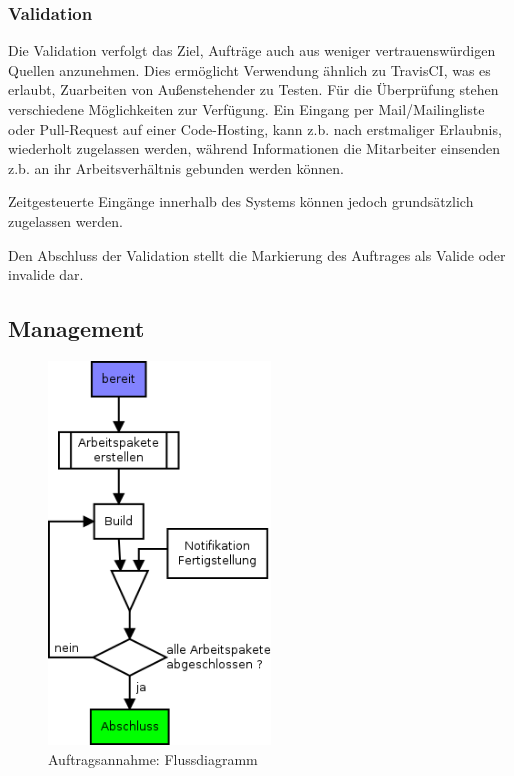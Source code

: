 \subsubsection{Validation}


Die Validation verfolgt das Ziel, Aufträge auch aus weniger vertrauenswürdigen Quellen anzunehmen.
Dies ermöglicht Verwendung ähnlich zu TravisCI, was es erlaubt, Zuarbeiten von Außenstehender zu Testen.
Für die Überprüfung stehen verschiedene Möglichkeiten zur Verfügung.
Ein Eingang per Mail/Mailingliste oder Pull-Request auf einer Code-Hosting,
kann z.b. nach erstmaliger Erlaubnis, wiederholt zugelassen werden,
während Informationen die Mitarbeiter einsenden z.b. an ihr Arbeitsverhältnis gebunden werden können.

Zeitgesteuerte Eingänge innerhalb des Systems können jedoch grundsätzlich zugelassen werden.

Den Abschluss der Validation stellt die Markierung des Auftrages als Valide oder invalide dar.

\subsection{Management}

\begin{figure}[ht] 
  \centering
  \label{fig:lebenszyklus-auftrag-abarbeitung}
  \includegraphics[height=4in]{imageinput/lebenszyklus-auftrag-abarbeitung.png}
  \caption{Auftragsannahme: Flussdiagramm}
\end{figure}

